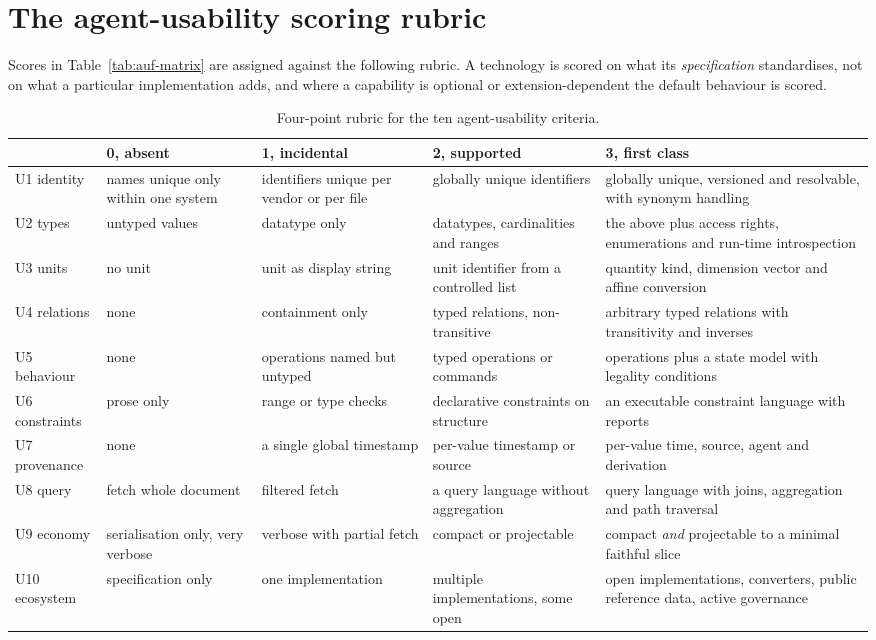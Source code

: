 \section{The agent-usability scoring rubric}
\label{app:rubric}

Scores in Table~\ref{tab:auf-matrix} are assigned against the following rubric.
A technology is scored on what its \emph{specification} standardises, not on what
a particular implementation adds, and where a capability is optional or
extension-dependent the default behaviour is scored.

\begin{table}[t]
\centering
\caption{Four-point rubric for the ten agent-usability criteria.}
\label{tab:rubric}
\footnotesize
\setlength{\tabcolsep}{3pt}
\begin{tabular}{@{}L{1.6cm}L{3.2cm}L{3.2cm}L{3.2cm}L{3.4cm}@{}}
\toprule
& \textbf{0, absent} & \textbf{1, incidental} & \textbf{2, supported} &
\textbf{3, first class} \\
\midrule
U1 identity & names unique only within one system &
identifiers unique per vendor or per file &
globally unique identifiers &
globally unique, versioned and resolvable, with synonym handling \\[2pt]
U2 types & untyped values & datatype only &
datatypes, cardinalities and ranges &
the above plus access rights, enumerations and run-time introspection \\[2pt]
U3 units & no unit & unit as display string &
unit identifier from a controlled list &
quantity kind, dimension vector and affine conversion \\[2pt]
U4 relations & none & containment only &
typed relations, non-transitive &
arbitrary typed relations with transitivity and inverses \\[2pt]
U5 behaviour & none & operations named but untyped &
typed operations or commands &
operations plus a state model with legality conditions \\[2pt]
U6 constraints & prose only & range or type checks &
declarative constraints on structure &
an executable constraint language with reports \\[2pt]
U7 provenance & none & a single global timestamp &
per-value timestamp or source &
per-value time, source, agent and derivation \\[2pt]
U8 query & fetch whole document & filtered fetch &
a query language without aggregation &
query language with joins, aggregation and path traversal \\[2pt]
U9 economy & serialisation only, very verbose &
verbose with partial fetch & compact or projectable &
compact \emph{and} projectable to a minimal faithful slice \\[2pt]
U10 ecosystem & specification only & one implementation &
multiple implementations, some open &
open implementations, converters, public reference data, active governance \\
\bottomrule
\end{tabular}
\end{table}

